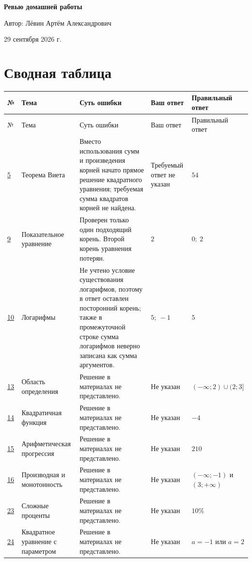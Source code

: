 \documentclass[12pt,a4paper]{article}
\begin{document}
\begin{titlepage}
\centering
\vspace*{0.22\textheight}
{\LARGE\bfseries Ревью домашней работы\par}
\vspace{1.6cm}
{\large Автор: Лёвин Артём Александрович\par}
\vspace{0.5cm}
{\large 29 сентября 2026 г.\par}
\vfill
{}
\end{titlepage}

\newpage
\section*{Сводная таблица}
\small
\begin{longtable}{>{\centering\arraybackslash}p{0.8cm} p{3.0cm} p{5.0cm} p{2.6cm} p{2.9cm}}
\toprule
№ & Тема & Суть ошибки & Ваш ответ & Правильный ответ \\
\midrule
\endfirsthead
\toprule
№ & Тема & Суть ошибки & Ваш ответ & Правильный ответ \\
\midrule
\endhead
\hyperref[task:5]{5} & Теорема Виета & Вместо использования сумм и произведения корней начато прямое решение квадратного уравнения; требуемая сумма квадратов корней не найдена. & Требуемый ответ не указан & $54$ \\
\addlinespace
\hyperref[task:9]{9} & Показательное уравнение & Проверен только один подходящий корень. Второй корень уравнения потерян. & $2$ & $0;\ 2$ \\
\addlinespace
\hyperref[task:10]{10} & Логарифмы & Не учтено условие существования логарифмов, поэтому в ответ оставлен посторонний корень; также в промежуточной строке сумма логарифмов неверно записана как сумма аргументов. & $5;\ -1$ & $5$ \\
\addlinespace
\hyperref[task:13]{13} & Область определения & Решение в материалах не представлено. & Не указан & $(-\infty;2)\cup(2;3]$ \\
\addlinespace
\hyperref[task:14]{14} & Квадратичная функция & Решение в материалах не представлено. & Не указан & $-4$ \\
\addlinespace
\hyperref[task:15]{15} & Арифметическая прогрессия & Решение в материалах не представлено. & Не указан & $210$ \\
\addlinespace
\hyperref[task:16]{16} & Производная и монотонность & Решение в материалах не представлено. & Не указан & $(-\infty;-1)$ и $(3;+\infty)$ \\
\addlinespace
\hyperref[task:23]{23} & Сложные проценты & Решение в материалах не представлено. & Не указан & $10\%$ \\
\addlinespace
\hyperref[task:24]{24} & Квадратное уравнение с параметром & Решение в материалах не представлено. & Не указан & $a=-1$ или $a=2$ \\
\bottomrule
\end{longtable}
\normalsize
\end{document}
